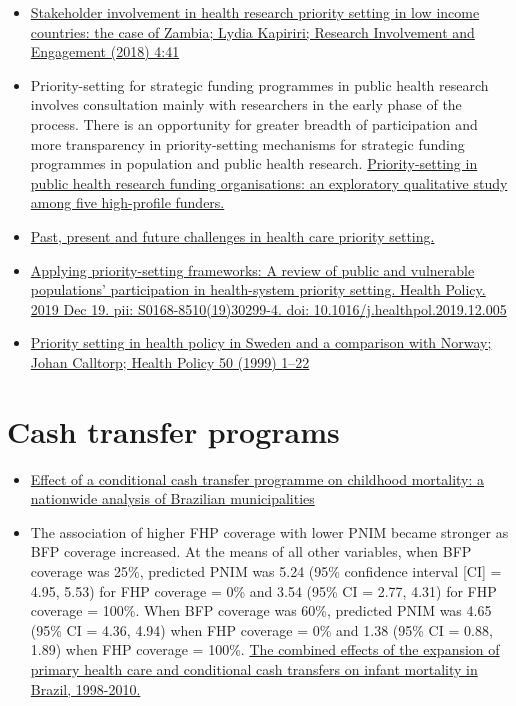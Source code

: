 \documentclass[]{book}
\begin{document}
\begin{itemize}
\item
  \href{https://www.ncbi.nlm.nih.gov/pmc/articles/PMC6234591/pdf/40900_2018_Article_121.pdf}{Stakeholder involvement in health research priority setting in low income countries: the case of Zambia; Lydia Kapiriri; Research Involvement and Engagement (2018) 4:41}
\item
  Priority-setting for strategic funding programmes in public health research involves consultation mainly with researchers in the early phase of the process. There is an opportunity for greater breadth of participation and more transparency in priority-setting mechanisms for strategic funding programmes in population and public health research. \href{https://www.ncbi.nlm.nih.gov/pmc/articles/PMC6014000/}{Priority-setting in public health research funding organisations: an exploratory qualitative study among five high-profile funders.}
\item
  \href{https://www.ncbi.nlm.nih.gov/pubmed/29771204}{Past, present and future challenges in health care priority setting.}
\item
  \href{https://www.ncbi.nlm.nih.gov/pubmed/31874742}{Applying priority-setting frameworks: A review of public and vulnerable populations' participation in health-system priority setting. Health Policy. 2019 Dec 19. pii: S0168-8510(19)30299-4. doi: 10.1016/j.healthpol.2019.12.005}
\item
  \href{http://www.medicine.mcgill.ca/epidemiology/courses/EPIB654/Summer2010/Policy/Health\%20policy\%20-\%20Sweden\%20-\%20compare\%20w-Norway.pdf}{Priority setting in health policy in Sweden and a comparison with Norway; Johan Calltorp; Health Policy 50 (1999) 1--22}
\end{itemize}

\hypertarget{cash-transfer-programs}{%
\section*{Cash transfer programs}\label{cash-transfer-programs}}

\begin{itemize}
\item
  \href{https://sci-hub.tw/https://doi.org/10.1016/S0140-6736(13)60715-1}{Effect of a conditional cash transfer programme on childhood mortality: a nationwide analysis of Brazilian municipalities}
\item
  The association of higher FHP coverage with lower PNIM became stronger as BFP coverage increased. At the means of all other variables, when BFP coverage was 25\%, predicted PNIM was 5.24 (95\% confidence interval {[}CI{]} = 4.95, 5.53) for FHP coverage = 0\% and 3.54 (95\% CI = 2.77, 4.31) for FHP coverage = 100\%. When BFP coverage was 60\%, predicted PNIM was 4.65 (95\% CI = 4.36, 4.94) when FHP coverage = 0\% and 1.38 (95\% CI = 0.88, 1.89) when FHP coverage = 100\%. \href{https://www.ncbi.nlm.nih.gov/pmc/articles/PMC3828713/pdf/AJPH.2013.301452.pdf}{The combined effects of the expansion of primary health care and conditional cash transfers on infant mortality in Brazil, 1998-2010.}
\end{itemize}
\end{document}
